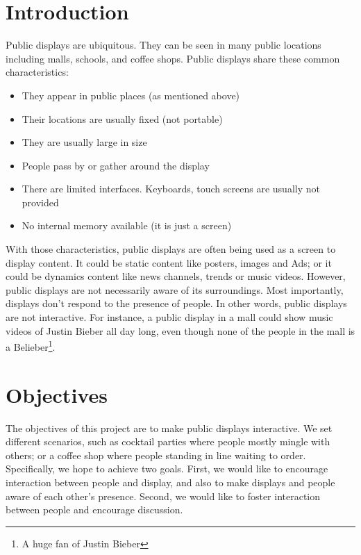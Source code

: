 \documentclass{sig-alternate}
\begin{document}


\section{Introduction}
Public displays are ubiquitous. They can be seen in many public locations including malls, schools, and coffee shops. Public displays share these common characteristics:
\begin{itemize}
	\item They appear in public places (as mentioned above)
	\item Their locations are usually fixed (not portable)
	\item They are usually large in size
	\item People pass by or gather around the display
	\item There are limited interfaces. Keyboards, touch screens are usually not provided
	\item No internal memory available (it is just a screen)
\end{itemize}

With those characteristics, public displays are often being used as a screen to display content. It could be static content like posters, images and Ads; or it could be dynamics content like news channels, trends or music videos. However, public displays are not necessarily aware of its surroundings. Most importantly, displays don't respond to the presence of people. In other words, public displays are not interactive. For instance, a public display in a mall could show music videos of Justin Bieber all day long, even though none of the people in the mall is a Belieber\footnote{A huge fan of Justin Bieber}.

\section{Objectives}
The objectives of this project are to make public displays interactive. We set different 
scenarios, such as cocktail parties where people mostly mingle with others; or a coffee 
shop where people standing in line waiting to order. Specifically, we hope to achieve two 
goals. First, we would like to encourage interaction between people and display, and 
also to make displays and people aware of each other's presence. Second, we would 
like to foster interaction between people and encourage discussion.
\end{document}
